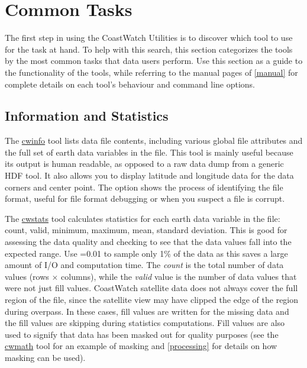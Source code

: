 \chapter{Common Tasks}
\label{common}

The first step in using the CoastWatch Utilities is to discover which
tool to use for the task at hand.  To help with this search, this
section categorizes the tools by the most common tasks that data users
perform.  Use this section as a guide to the functionality
of the tools, while referring to the manual pages of \autoref{manual}
for complete details on each tool's behaviour and command line
options.

\section{Information and Statistics}

The \hyperlink{cwinfo}{cwinfo} tool lists data file contents,
including various global file attributes and the full set of
earth data variables in the file.  This tool is mainly useful
because its output is human readable, as opposed to a raw data
dump from a generic HDF tool.  It also allows you to display
latitude and longitude data for the data corners and center
point.  The  option shows the process of
identifying the file format, useful for file format debugging or
when you suspect a file is corrupt.

The \hyperlink{cwstats}{cwstats} tool calculates statistics for
each earth data variable in the file: count, valid, minimum,
maximum, mean, standard deviation.  This is good for assessing
the data quality and checking to see that the data values fall
into the expected range.  Use =0.01 to sample
only 1\% of the data as this saves a large amount of I/O and
computation time.  The {\em count} is the total number of data
values (rows $\times$ columns), while the {\em valid} value is
the number of data values that were not just fill values.
CoastWatch satellite data does not always cover the full region
of the file, since the satellite view may have clipped the edge
of the region during overpass.  In these cases, fill values are
written for the missing data and the fill values are skipping
during statistics computations.  Fill values are also used to
signify that data has been masked out for quality purposes (see
the \hyperlink{cwmath}{cwmath} tool for an example of masking and
\autoref{processing} for details on how masking can be used).

